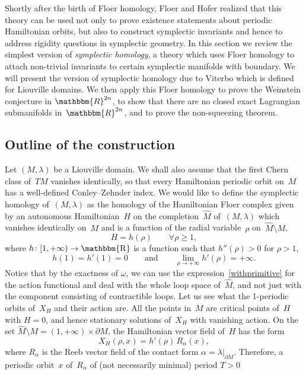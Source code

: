 \documentclass[12pt,twoside]{amsart}
\theoremstyle{plain}
\numberwithin{figure}{section}
\numberwithin{equation}{section}
\def\RR{\mathbbm{R}}
\def\R{\operatorname{\mathbbm{R}}}
\begin{document}
Shortly after the birth of Floer homology, Floer and Hofer realized that this theory can be used not only to prove existence statements about periodic Hamiltonian orbits, 
but also to construct symplectic invariants and hence to address rigidity questions in symplectic geometry. 
%
In this section we review the simplest version of {\em symplectic homology}, a theory which uses Floer homology to attach non-trivial invariants to certain symplectic manifolds with boundary. 
We will present the version of symplectic homology due to Viterbo which is defined for Liouville domains. 
%
We then apply this Floer homology to prove the Weinstein conjecture in $\RR^{2n}$, to show that there are no closed exact Lagrangian
submanifolds in~$\RR^{2n}$, and to prove the non-squeezing theorem.


\subsection{Outline of the construction} 
\label{s:SH}
Let $(M,\lambda)$ be a Liouville domain. We shall also assume that the first Chern class of~$TM$ vanishes identically, so that every Hamiltonian periodic orbit on~$M$ has a well-defined Conley--Zehnder index. We would like to define the symplectic homology of~$(M,\lambda)$ as the homology
of the Hamiltonian Floer complex given by an autonomous Hamiltonian~$H$ on the completion~$\widehat M$
of~$(M,\lambda)$ which vanishes identically on~$M$ and is a function of 
the radial variable~$\rho$ on~$\widehat{M}\setminus M$,
\[
H = h(\rho) \qquad \forall \rho \geqslant 1,
\]
where $h \colon [1,+\infty) \rightarrow \R$ is a function such that 
$h''(\rho) > 0$ for $\rho >1$,
\begin{equation}
\label{condh}
h(1)=h'(1) = 0 \qquad \mbox{and} \qquad \lim_{\rho\rightarrow +\infty} h'(\rho)=+\infty.
\end{equation}
Notice that by the exactness of $\omega$, we can use the expression~\eqref{withprimitive} 
for the action functional and deal with the whole loop space of~$\widehat{M}$, 
and not just with the component consisting of contractible loops. 
Let us see what the 1-periodic orbits of~$X_H$ and their action are. All the points in~$M$ are critical points of~$H$ with $H=0$, and hence stationary solutions of~$X_H$ with vanishing action. On the set $\widehat{M} \setminus M = (1,+\infty) \times \partial M$, the Hamiltonian vector field of~$H$ has the form
\[
X_H(\rho,x) = h'(\rho)\, R_{\alpha}(x),
\]
where $R_{\alpha}$ is the Reeb vector field of the contact form $\alpha = \lambda|_{\partial M}$. Therefore, a periodic orbit~$x$ of~$R_{\alpha}$ of (not necessarily minimal) period $T>0$ 
\end{document}
